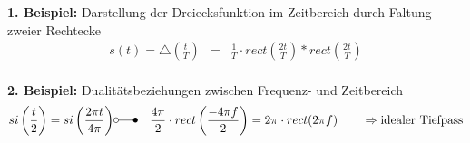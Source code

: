 \flushleft
\textbf{1. Beispiel:} \quad Darstellung der Dreiecksfunktion im Zeitbereich durch Faltung zweier Rechtecke
\begin{eqnarray*} 
s(t) = \triangle \left( \frac{t}{T} \right) &=& \frac{1}{T} \cdot rect \left(\frac{2t}{T} \right) \ast rect \left(\frac{2t}{T} \right) 
\end{eqnarray*}\\
\textbf{2. Beispiel:} \quad Dualitätsbeziehungen zwischen Frequenz- und Zeitbereich
\begin{eqnarray*} 
si\left( \frac{t}{2}\right) = si\left( \frac{2  \pi t}{4 \pi }\right) &\laplace&  \frac{4 \pi}{2} \cdot rect\left( \frac{- 4 \pi f}{2}\right)  = 2 \pi \cdot rect(2 \pi f) \qquad \Rightarrow \text{idealer Tiefpass}
\end{eqnarray*}\\~
